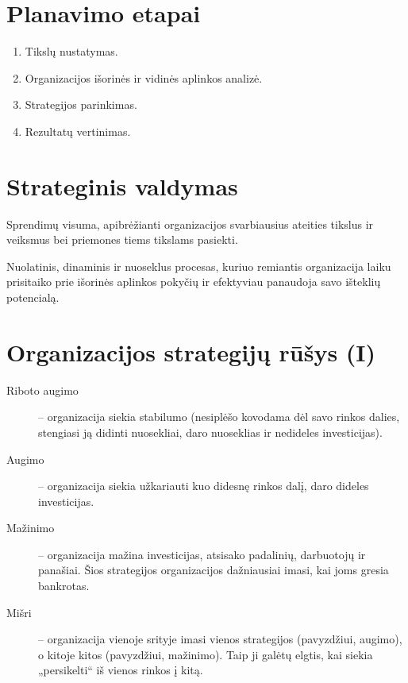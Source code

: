 \section{Planavimo etapai}

\begin{enumerate}
  \item Tikslų nustatymas.
  \item Organizacijos išorinės ir vidinės aplinkos analizė.
  \item Strategijos parinkimas.
  \item Rezultatų vertinimas.
\end{enumerate}

\section{Strateginis valdymas}

\begin{defn}[Strategija]
  Sprendimų visuma, apibrėžianti organizacijos svarbiausius ateities
  tikslus ir veiksmus bei priemones tiems tikslams pasiekti.
\end{defn}

\begin{defn}
  Nuolatinis, dinaminis ir nuoseklus procesas, kuriuo remiantis
  organizacija laiku prisitaiko prie išorinės aplinkos pokyčių ir
  efektyviau panaudoja savo išteklių potencialą.
\end{defn}

\section{Organizacijos strategijų rūšys (I)}

\begin{description}
  \item[Riboto augimo] \label{strategija:rusys:ribotas} – organizacija
    siekia stabilumo (nesiplėšo kovodama dėl savo rinkos dalies,
    stengiasi ją didinti nuosekliai, daro nuoseklias ir nedideles
    investicijas).
  \item[Augimo] – organizacija siekia užkariauti kuo didesnę rinkos
    dalį, daro dideles investicijas.
  \item[Mažinimo] – organizacija mažina investicijas, atsisako padalinių,
    darbuotojų ir panašiai. Šios strategijos organizacijos dažniausiai
    imasi, kai joms gresia bankrotas.
  \item[Mišri] – organizacija vienoje srityje imasi vienos strategijos
    (pavyzdžiui, augimo), o kitoje kitos (pavyzdžiui, mažinimo). Taip
    ji galėtų elgtis, kai siekia „persikelti“ iš vienos rinkos į kitą.
\end{description}

